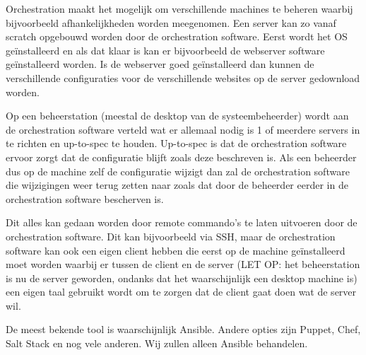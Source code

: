 Orchestration maakt het mogelijk om verschillende machines te beheren waarbij bijvoorbeeld afhankelijkheden worden meegenomen. Een server kan zo vanaf scratch opgebouwd worden door de orchestration software. Eerst wordt het OS ge\"installeerd en als dat klaar is kan er bijvoorbeeld de webserver software ge\"installeerd worden. Is de webserver goed ge\"installeerd dan kunnen de verschillende configuraties voor de verschillende websites op de server gedownload worden.

Op een beheerstation (meestal de desktop van de systeembeheerder) wordt aan de orchestration software verteld wat er allemaal nodig is 1 of meerdere servers in te richten en up-to-spec te houden. Up-to-spec is dat de orchestration software ervoor zorgt dat de configuratie blijft zoals deze beschreven is. Als een beheerder dus op de machine zelf de configuratie wijzigt dan zal de orchestration software die wijzigingen weer terug zetten naar zoals dat door de beheerder eerder in de orchestration software bescherven is.

Dit alles kan gedaan worden door remote commando's te laten uitvoeren door de orchestration software. Dit kan bijvoorbeeld via SSH, maar de orchestration software kan ook een eigen client hebben die eerst op de machine ge\"installeerd moet worden waarbij er tussen de client en de server (LET OP: het beheerstation is nu de server geworden, ondanks dat het waarschijnlijk een desktop machine is) een eigen taal gebruikt wordt om te zorgen dat de client gaat doen wat de server wil.

De meest bekende tool is waarschijnlijk Ansible. Andere opties zijn Puppet, Chef, Salt Stack en nog vele anderen. Wij zullen alleen Ansible behandelen.

